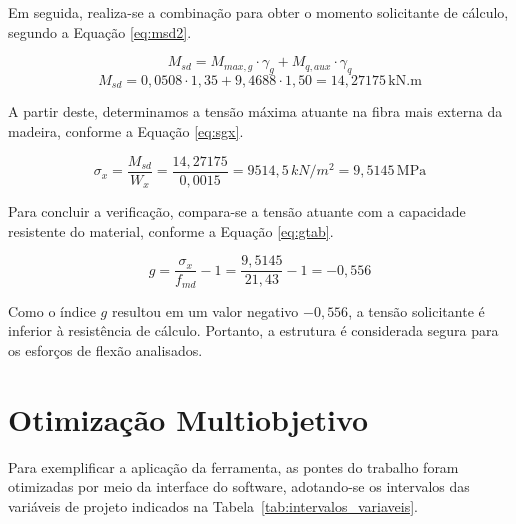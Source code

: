 Em seguida, realiza-se a combinação para obter o momento solicitante de cálculo, segundo a Equação \eqref{eq:msd2}.

\begin{equation}
M_{sd} = M_{max,g} \cdot \gamma_g + M_{q,aux} \cdot \gamma_q
\end{equation}
\begin{equation}
M_{sd} = 0,0508 \cdot 1,35 + 9,4688 \cdot 1,50 = 14,27175\, \text{kN.m}
\label{eq:msd2}
\end{equation}

 A partir deste, determinamos a tensão máxima atuante na fibra mais externa da madeira, conforme a Equação \eqref{eq:sgx}.

\begin{equation}
\sigma_x = \frac{M_{sd}}{W_x} = \frac{14,27175}{0,0015} = 9514,5\,kN/m^2 = 9,5145\, \text{MPa}
\label{eq:sgx}
\end{equation}

Para concluir a verificação, compara-se a tensão atuante com a capacidade resistente do material, conforme a Equação \eqref{eq:gtab}.

\begin{equation}
g = \frac{\sigma_x}{f_{md}} - 1
  = \frac{9,5145}{21,43} - 1 = -0,556
\label{eq:gtab}
\end{equation}

Como o índice $g$ resultou em um valor negativo $-0,556$, a tensão solicitante é inferior à resistência de cálculo. Portanto, a estrutura é considerada segura para os esforços de flexão analisados.

\section{Otimização Multiobjetivo}

Para exemplificar a aplicação da ferramenta, as pontes do trabalho foram otimizadas por meio da interface do software, adotando-se os intervalos das variáveis de projeto indicados na Tabela~\ref{tab:intervalos_variaveis}.

